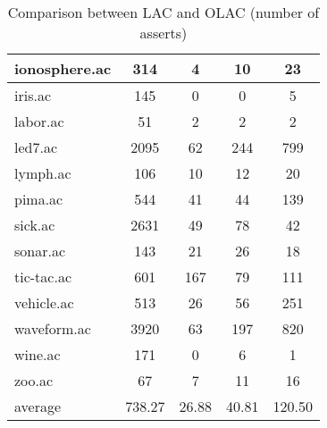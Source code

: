 \begin{table}[htbp]
\begin{tabular}{|l|c|c|c|c|}
		\hline
		ionosphere.ac   & 314           & 4                  & 10                       & 23                            \\
		\hline
		iris.ac         & 145           & 0                  & 0                        & 5                             \\
		\hline
		labor.ac        & 51            & 2                  & 2                        & 2                             \\
		\hline
		led7.ac         & 2095          & 62                 & 244                      & 799                           \\
		\hline
		lymph.ac        & 106           & 10                 & 12                       & 20                            \\
		\hline
		pima.ac         & 544           & 41                 & 44                       & 139                           \\
		\hline
		sick.ac         & 2631          & 49                 & 78                       & 42                            \\
		\hline
		sonar.ac        & 143           & 21                 & 26                       & 18                            \\
		\hline
		tic-tac.ac      & 601           & 167                & 79                       & 111                           \\
		\hline
		vehicle.ac      & 513           & 26                 & 56                       & 251                           \\
		\hline
		waveform.ac     & 3920          & 63                 & 197                      & 820                           \\
		\hline
		wine.ac         & 171           & 0                  & 6                        & 1                             \\
		\hline
		zoo.ac          & 67            & 7                  & 11                       & 16                            \\
		\hline
		average         & 738.27        & 26.88              & 40.81                    & 120.50                        \\
		\hline
		\end{tabular}
	\caption{Comparison between LAC and OLAC (number of asserts)}
	\label{tab:comparison_lac_olac_uc}
\end{table}